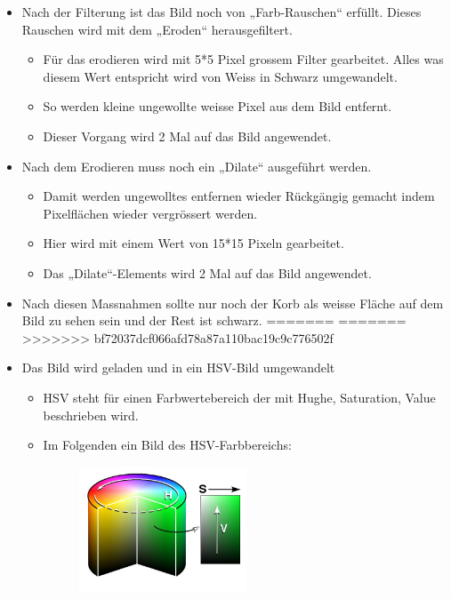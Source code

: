 \begin{itemize}
\begin{itemize}
\begin{itemize}
		\end{itemize}
	\end{itemize}
	\item Nach der Filterung ist das Bild noch von „Farb-Rauschen“ erfüllt. Dieses Rauschen wird mit dem „Eroden“ herausgefiltert.
	\begin{itemize}
		\item Für das erodieren wird mit 5*5 Pixel grossem Filter gearbeitet. Alles was diesem Wert entspricht wird von Weiss in Schwarz umgewandelt.
		\item So werden kleine ungewollte weisse Pixel aus dem Bild entfernt.
		\item Dieser Vorgang wird 2 Mal auf das Bild angewendet.
	\end{itemize}
	\item Nach dem Erodieren muss noch ein „Dilate“ ausgeführt werden.
	\begin{itemize}
		\item Damit werden ungewolltes entfernen wieder Rückgängig gemacht indem Pixelflächen wieder vergrössert werden.
		\item Hier wird mit einem Wert von 15*15 Pixeln gearbeitet.
		\item Das „Dilate“-Elements wird 2 Mal auf das Bild angewendet.
	\end{itemize}
	\item Nach diesen Massnahmen sollte nur noch der Korb als weisse Fläche auf dem Bild zu sehen sein und der Rest ist schwarz.
=======
=======
>>>>>>> bf72037dcf066afd78a87a110bac19c9c776502f
    \item Das Bild wird geladen und in ein HSV-Bild umgewandelt
    \begin{itemize}
        \item HSV steht für einen Farbwertebereich der mit Hughe, Saturation, 
            Value beschrieben wird.
        \item Im Folgenden ein Bild des HSV-Farbbereichs:\\
        \begin{figure}[h!]
            \centering
            \includegraphics[width=0.5\textwidth]{fig/HSV_cylinder.jpg}

\end{figure}
\end{itemize}
\end{itemize}
